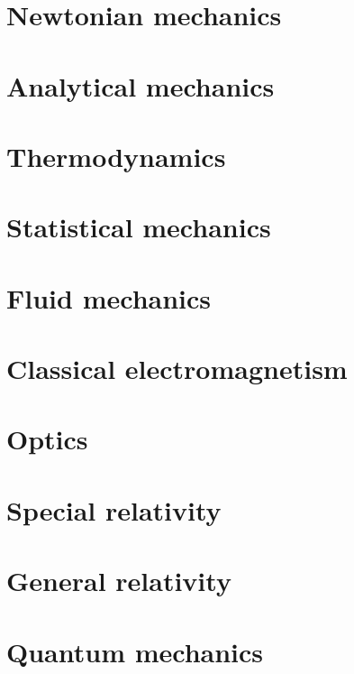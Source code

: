 \documentclass{report}
\begin{document}
\part{Newtonian mechanics}
\setcounter{chapter}{0} %


\part{Analytical mechanics}
\setcounter{chapter}{0} %


\part{Thermodynamics}
\setcounter{chapter}{0} %

\part{Statistical mechanics}
\setcounter{chapter}{0} %


\part{Fluid mechanics}
\setcounter{chapter}{0} %


\part{Classical electromagnetism}
\setcounter{chapter}{0} %


\part{Optics}
\setcounter{chapter}{0} %



\part{Special relativity}
\setcounter{chapter}{0} %


\part{General relativity}
\setcounter{chapter}{0} %


\part{Quantum mechanics}
\setcounter{chapter}{0} %

\end{document}
